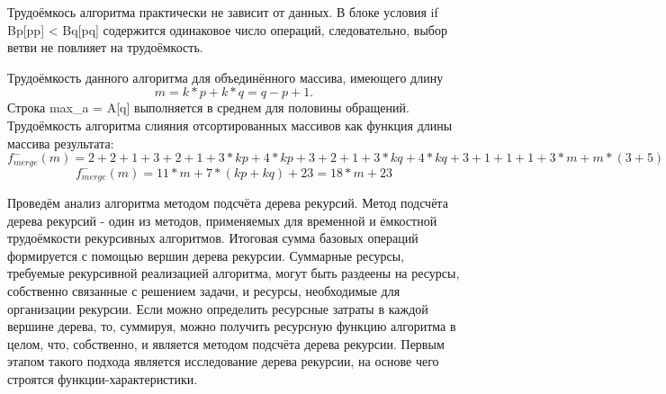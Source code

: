 \documentclass[12pt,a4paper]{scrartcl}
\begin{document}

Трудоёмкось алгоритма практически не зависит от данных. В блоке условия if Bp[pp] < Bq[pq] содержится одинаковое число операций, следовательно, выбор ветви не повлияет на трудоёмкость.

Трудоёмкость данного алгоритма для объединённого массива, имеющего длину 
\begin{equation*}
 m = k*p + k*q = q - p + 1.
\end{equation*}
Строка max\_a = A[q] выполняется в среднем для половины обращений.
Трудоёмкость алгоритма слияния отсортированных массивов как функция длины массива результата:
\begin{equation}\label{eq2.1}
f_{merge}^-(m) = 2 + 2 + 1 + 3 + 2 + 1 + 3*kp + 4*kp + 3 + 2 + 1 + 3*kq + 4*kq + 3 + 1 + 1 + 1 + 3*m + m*(3 + 5)
\end{equation}
\begin{equation}\label{eq2.2}
f_{merge}^-(m) = 11*m + 7*(kp + kq) + 23 = 18*m + 23
\end{equation}

Проведём анализ алгоритма методом подсчёта дерева рекурсий. Метод подсчёта дерева рекурсий - один из методов, применяемых для временной и ёмкостной трудоёмкости рекурсивных алгоритмов. Итоговая сумма базовых операций формируется с помощью вершин дерева рекурсии. Суммарные ресурсы, требуемые рекурсивной реализацией алгоритма, могут быть раздеены на ресурсы, собственно связанные с решением задачи, и ресурсы, необходимые для организации рекурсии. Если можно определить ресурсные затраты в каждой вершине дерева, то, суммируя, можно получить ресурсную функцию алгоритма в целом, что, собственно, и является методом подсчёта дерева рекурсии. Первым этапом такого подхода является исследование дерева рекурсии, на основе чего строятся функции-характеристики. \cite{Tree}
\end{document}
